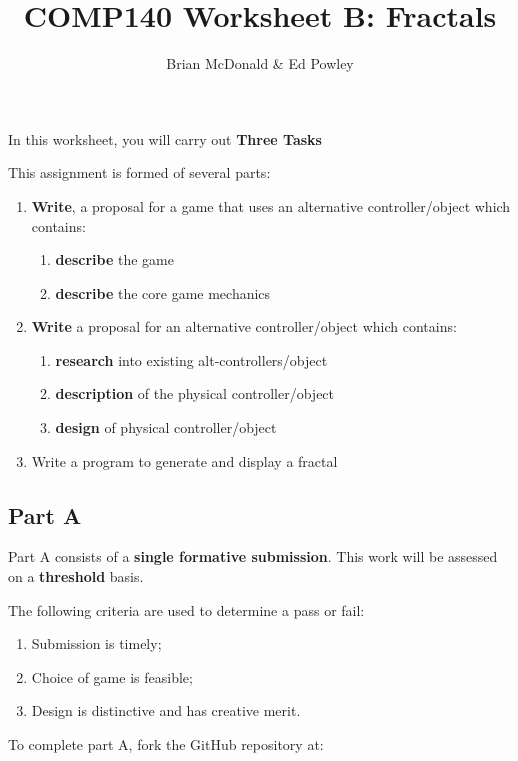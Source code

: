 \documentclass{../../../fal_assignment}
\title{COMP140 Worksheet B: Fractals}
\author{Brian McDonald \& Ed Powley}
\begin{document}
\maketitle

In this worksheet, you will carry out \textbf{Three Tasks}

This assignment is formed of several parts:

\begin{enumerate}[label=(\Alph*)]
	\item \textbf{Write}, a proposal for a game that uses an alternative controller/object which contains:
	\begin{enumerate}[label=\roman*.]
		\item \textbf{describe} the game
		\item \textbf{describe} the core game mechanics
	\end{enumerate}
	\item \textbf{Write} a proposal for an alternative controller/object which contains: 
	\begin{enumerate}[label=\roman*.]
		\item \textbf{research} into existing alt-controllers/object
		\item \textbf{description} of the physical controller/object
		\item \textbf{design} of physical controller/object
	\end{enumerate}
	\item {Write} a program to generate and display a fractal
\end{enumerate}


\subsection*{Part A}

Part A consists of a \textbf{single formative submission}. This work will be assessed on a \textbf{threshold} basis. 

The following criteria are used to determine a pass or fail:

\begin{enumerate}[label=(\alph*)]
	\item Submission is timely;
	\item Choice of game is feasible;
	\item Design is distinctive and has creative merit.
\end{enumerate}

To complete part A, fork the GitHub repository at:
\end{document}
